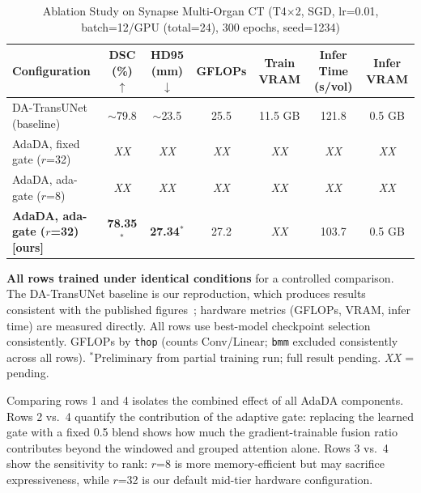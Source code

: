 \documentclass[conference]{IEEEtran}
\begin{document}
\begin{table}[t]
  \caption{Ablation Study on Synapse Multi-Organ CT (T4$\times$2, SGD, lr=0.01, batch=12/GPU (total=24), 300 epochs, seed=1234)}
  \label{tab:ablation}
  \begin{center}
  \setlength{\tabcolsep}{5pt}
  \begin{tabular}{lcccccc}
    \toprule
    Configuration & DSC (\%) $\uparrow$ & HD95 (mm) $\downarrow$ & GFLOPs & Train VRAM & Infer Time (s/vol) & Infer VRAM \\
    \midrule
    DA-TransUNet (baseline)    & $\sim$79.8   & $\sim$23.5   & 25.5 & 11.5 GB & 121.8        & 0.5 GB       \\
    AdaDA, fixed gate ($r$=32) & \textit{XX}  & \textit{XX}  & \textit{XX} & \textit{XX} & \textit{XX} & \textit{XX} \\
    AdaDA, ada-gate ($r$=8)    & \textit{XX}  & \textit{XX}  & \textit{XX} & \textit{XX} & \textit{XX} & \textit{XX} \\
    \textbf{AdaDA, ada-gate ($r$=32) [ours]} & \textbf{78.35}$^*$ & \textbf{27.34}$^*$ & 27.2 & \textit{XX} & 103.7 & 0.5 GB \\
    \bottomrule
  \end{tabular}
  \end{center}
  \vspace{-0.4em}
  \footnotesize{\textbf{All rows trained under identical conditions} for a controlled comparison. The DA-TransUNet baseline is our reproduction, which produces results consistent with the published figures~\cite{sun2024datransunet}; hardware metrics (GFLOPs, VRAM, infer time) are measured directly. All rows use best-model checkpoint selection consistently. GFLOPs by \texttt{thop} (counts Conv/Linear; \texttt{bmm} excluded consistently across all rows). $^*$Preliminary from partial training run; full result pending. \textit{XX} = pending.}
\end{table}

Comparing rows 1 and 4 isolates the combined effect of all AdaDA components. Rows 2 vs.\ 4 quantify the contribution of the adaptive gate: replacing the learned gate with a fixed 0.5 blend shows how much the gradient-trainable fusion ratio contributes beyond the windowed and grouped attention alone. Rows 3 vs.\ 4 show the sensitivity to rank: $r$=8 is more memory-efficient but may sacrifice expressiveness, while $r$=32 is our default mid-tier hardware configuration.


\end{document}
